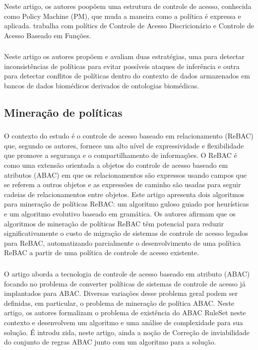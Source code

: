 \subsubsection{}
Neste artigo, os autores poopõem uma estrutura de controle de acesso, conhecida como Policy Machine (PM), que muda a maneira como a política é expressa e aplicada. trabalha com polítics de Controle de Acesso Discricionário e Controle de Acesso Baseado em Funções.

\subsubsection{}
Neste artigo os autores propõem e avaliam duas estratégias, uma para detectar inconsistências de políticas para evitar possíveis ataques de inferência e outra para detectar conflitos de políticas dentro do contexto de dados armazenados em bancos de dados biomédicos derivados de ontologias biomédicas.

\subsection{Mineração de políticas}\label{sec:mineracao-politicas}
\subsubsection{  }
O contexto do estudo é o controle de acesso baseado em relacionamento (ReBAC) que, segundo os autores, fornece um alto nível de expressividade e flexibilidade que promove a segurança e o compartilhamento de informações. O ReBAC é como uma extensão orientada a objetos do controle de acesso baseado em atributos (ABAC) em que os relacionamentos são expressos usando campos que se referem a outros objetos e as expressões de caminho são usadas para seguir cadeias de relacionamentos entre objetos. Este artigo apresenta dois algoritmos para mineração de políticas ReBAC: um algoritmo guloso guiado por heurísticas e um algoritmo evolutivo baseado em gramática. Os autores afirmam que os algoritmos de mineração de políticas ReBAC têm potencial para reduzir significativamente o custo de migração de sistemas de controle de acesso legados para ReBAC, automatizando parcialmente o desenvolvimento de uma política ReBAC a partir de uma política de controle de acesso existente.

\subsubsection{}
O artigo aborda a tecnologia de controle de acesso baseado em atributo (ABAC) focando no problema de converter políticas de sistemas de controle de acesso já implantados para ABAC. Diversas variações desse problema geral podem ser definidas, em particular, o problema de mineração de política ABAC. Neste artigo, os autores formalizam o problema de existência do ABAC RuleSet neste contexto e desenvolvem um algoritmo e uma análise de complexidade para sua solução. É introdu zida, neste artigo, ainda a noção de Correção de inviabilidade do conjunto de regras ABAC junto com um algoritmo para a solução.


